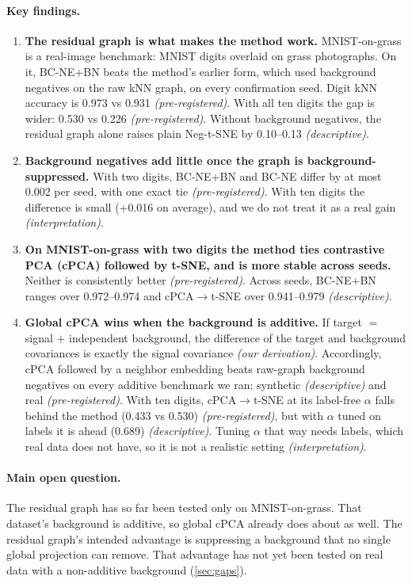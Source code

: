 \documentclass[10pt]{article}
\newcommand{\methodname}{BC-NE}
\newcommand{\BN}{\methodname{}+BN}
\newcommand{\cder}{\textit{\small (our derivation)}}
\newcommand{\cpre}{\textit{\small (pre-registered)}}
\newcommand{\cdesc}{\textit{\small (descriptive)}}
\newcommand{\cinterp}{\textit{\small (interpretation)}}
\begin{document}
\paragraph{Key findings.}
\begin{enumerate}
  \item \textbf{The residual graph is what makes the method work.} MNIST-on-grass is a real-image benchmark: MNIST digits overlaid on grass photographs. On it, \BN{} beats the method's earlier form, which used background negatives on the raw kNN graph, on every confirmation seed. Digit kNN accuracy is 0.973 vs 0.931 \cpre. With all ten digits the gap is wider: 0.530 vs 0.226 \cpre. Without background negatives, the residual graph alone raises plain Neg-t-SNE by 0.10--0.13 \cdesc.
  \item \textbf{Background negatives add little once the graph is background-suppressed.} With two digits, \BN{} and \methodname{} differ by at most 0.002 per seed, with one exact tie \cpre. With ten digits the difference is small (+0.016 on average), and we do not treat it as a real gain \cinterp.
  \item \textbf{On MNIST-on-grass with two digits the method ties contrastive PCA (cPCA) followed by t-SNE, and is more stable across seeds.} Neither is consistently better \cpre. Across seeds, \BN{} ranges over 0.972--0.974 and cPCA$\to$t-SNE over 0.941--0.979 \cdesc.
  \item \textbf{Global cPCA wins when the background is additive.} If target $=$ signal $+$ independent background, the difference of the target and background covariances is exactly the signal covariance \cder. Accordingly, cPCA followed by a neighbor embedding beats raw-graph background negatives on every additive benchmark we ran: synthetic \cdesc{} and real \cpre. With ten digits, cPCA$\to$t-SNE at its label-free $\alpha$ falls behind the method (0.433 vs 0.530) \cpre, but with $\alpha$ tuned on labels it is ahead (0.689) \cdesc. Tuning $\alpha$ that way needs labels, which real data does not have, so it is not a realistic setting \cinterp.
\end{enumerate}

\paragraph{Main open question.} The residual graph has so far been tested only on MNIST-on-grass. That dataset's background is additive, so global cPCA already does about as well. The residual graph's intended advantage is suppressing a background that no single global projection can remove. That advantage has not yet been tested on real data with a non-additive background (\cref{sec:gaps}).
\end{document}
